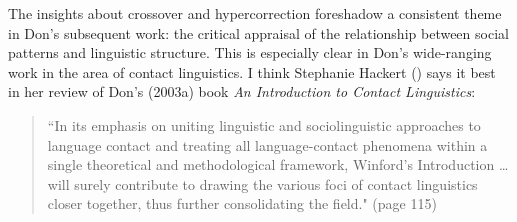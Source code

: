 \documentclass[output=paper, colorlinks,citecolor=brown]{langscibook}
\begin{document}
The insights about crossover and hypercorrection foreshadow a consistent theme in Don's subsequent work: the critical appraisal of the relationship between social patterns and linguistic structure. This is especially clear in Don's wide-ranging work in the area of contact linguistics. I think Stephanie Hackert (\citeyear{Hackert2005}) says it best in her review of Don's (2003a) book \textit{An Introduction to Contact Linguistics}:
\begin{quote}

“In its emphasis on uniting linguistic and sociolinguistic approaches to language contact and treating all language-contact phenomena within a single theoretical and methodological framework, Winford’s Introduction … will surely contribute to drawing the various foci of contact linguistics closer together, thus further consolidating the field." (page 115) 
\end{quote}
\end{document}
